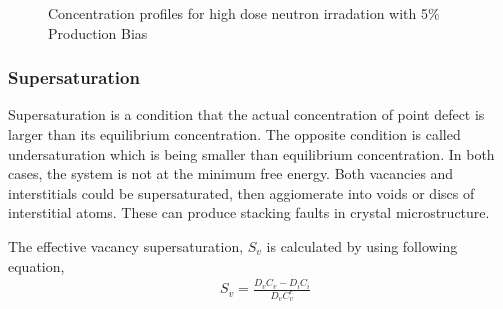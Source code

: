 \documentclass[a4paper]{article}
\begin{document}
\begin{figure}[htb!]
        \caption{Concentration profiles for high dose neutron irradation with 5\% Production Bias}
        \label{figure:concentrations_neutron_5_1e-3}
      \end{figure}

    \newpage
    \subsubsection{Supersaturation} \hspace{10pt}
    Supersaturation is a condition that the actual concentration of point defect is larger than its equilibrium concentration. The opposite condition is called undersaturation which is being smaller than equilibrium concentration. In both cases, the system is not at the minimum free energy. Both vacancies and interstitials could be supersaturated, then aggiomerate into voids or discs of interstitial atoms. These can produce stacking faults in crystal microstructure.

    The effective vacancy supersaturation, ${S_v}$ is calculated by using following equation,\cite{was2016}\\

    \begin{equation}
      \begin{aligned}
        &S_v=\frac{D_vC_v-D_iC_i}{D_vC_v^e}\\
      \end{aligned}
    \end{equation}\\
\end{document}
